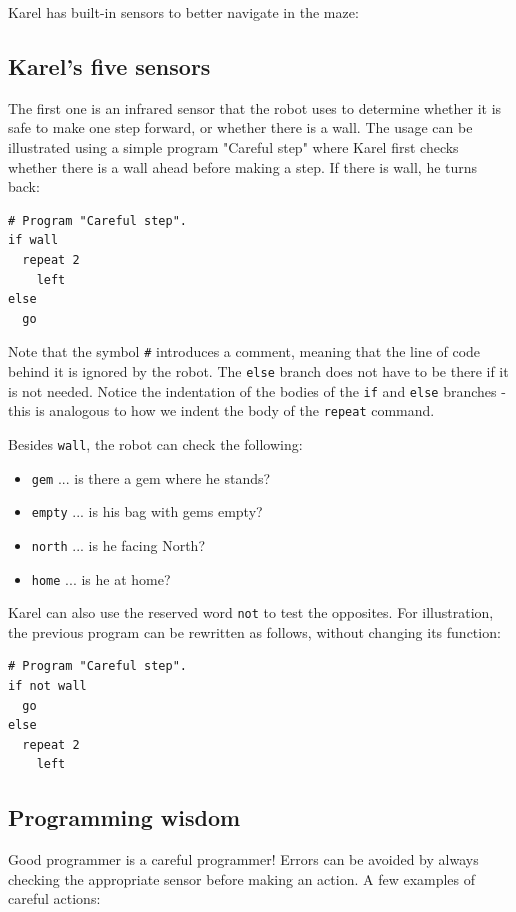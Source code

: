 \documentclass[article,A4,12pt]{llncs}
\begin{document}
\noindent
Karel has built-in sensors to better navigate in the maze:

\subsection{Karel's five sensors}

The first one is an infrared sensor that the robot uses to determine 
whether it is safe to make one step forward, or whether there is a wall.
The usage can be illustrated using a simple program "Careful step" 
where Karel first checks whether there is a wall ahead before
making a step. If there is wall, he turns back: 

\begin{verbatim}
# Program "Careful step".
if wall
  repeat 2
    left
else
  go
\end{verbatim}
Note that the symbol {\tt \#} introduces a comment, meaning that the line 
of code behind it is ignored by the robot.
The {\tt else} branch does not have to be there if it is not needed. Notice the indentation 
of the bodies of the {\tt if} and {\tt else} branches - this is analogous 
to how we indent the body of the {\tt repeat} command.

Besides {\tt wall}, the robot can check the following:
\begin{itemize}
\item {\tt gem} ... is there a gem where he stands?
\item {\tt empty} ... is his bag with gems empty?
\item {\tt north} ... is he facing North?
\item {\tt home} ... is he at home?
\end{itemize}
Karel can also use the reserved word {\tt not} to test the opposites.
For illustration, the previous program can be rewritten as follows, without changing its function:
\begin{verbatim}
# Program "Careful step".
if not wall
  go
else
  repeat 2
    left
\end{verbatim}

\subsection{Programming wisdom}

Good programmer is a careful programmer! Errors can be avoided by always checking the 
appropriate sensor before making an action. A few examples of careful actions:
 
\end{document}
